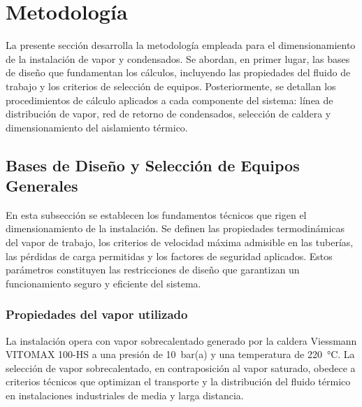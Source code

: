 
\section{Metodología}
\label{sec:metodologia}

La presente sección desarrolla la metodología empleada para el dimensionamiento de la instalación de vapor y condensados. Se abordan, en primer lugar, las bases de diseño que fundamentan los cálculos, incluyendo las propiedades del fluido de trabajo y los criterios de selección de equipos. Posteriormente, se detallan los procedimientos de cálculo aplicados a cada componente del sistema: línea de distribución de vapor, red de retorno de condensados, selección de caldera y dimensionamiento del aislamiento térmico.

\subsection{Bases de Diseño y Selección de Equipos Generales}
\label{subsec:bases-diseno}

En esta subsección se establecen los fundamentos técnicos que rigen el dimensionamiento de la instalación. Se definen las propiedades termodinámicas del vapor de trabajo, los criterios de velocidad máxima admisible en las tuberías, las pérdidas de carga permitidas y los factores de seguridad aplicados. Estos parámetros constituyen las restricciones de diseño que garantizan un funcionamiento seguro y eficiente del sistema.

\subsubsection{Propiedades del vapor utilizado}
\label{subsubsec:propiedades-vapor}

La instalación opera con vapor sobrecalentado generado por la caldera Viessmann VITOMAX 100-HS a una presión de 10~bar(a) y una temperatura de 220~°C. La selección de vapor sobrecalentado, en contraposición al vapor saturado, obedece a criterios técnicos que optimizan el transporte y la distribución del fluido térmico en instalaciones industriales de media y larga distancia.

